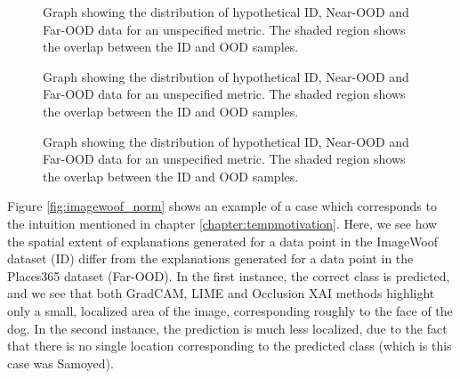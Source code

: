 \documentclass[UKenglish]{uiomasterthesis} %
\theoremstyle{definition}
\begin{document}
\begin{figure}
    \label{fig:gradcam}
    \begin{center}
        
    \end{center}
    \caption[Hypothetical ID/OOD distributions for an OOD detection metric]{Graph showing the distribution of hypothetical ID, Near-OOD and Far-OOD data for an unspecified metric. The shaded region shows the overlap between the ID and OOD samples.}
\end{figure}

\begin{figure}
    \label{fig:gradcam}
    \begin{center}
        
    \end{center}
    \caption[Hypothetical ID/OOD distributions for an OOD detection metric]{Graph showing the distribution of hypothetical ID, Near-OOD and Far-OOD data for an unspecified metric. The shaded region shows the overlap between the ID and OOD samples.}
\end{figure}

\begin{figure}
    \label{fig:lime}
    \begin{center}
        
    \end{center}
    \caption[Hypothetical ID/OOD distributions for an OOD detection metric]{Graph showing the distribution of hypothetical ID, Near-OOD and Far-OOD data for an unspecified metric. The shaded region shows the overlap between the ID and OOD samples.}
\end{figure}


Figure \ref{fig:imagewoof_norm} shows an example of a case which corresponds to the intuition mentioned in chapter \ref{chapter:tempmotivation}. Here, we see how the spatial extent of explanations generated for a data point in the ImageWoof dataset (ID) differ from the explanations generated for a data point in the Places365 dataset (Far-OOD). In the first instance, the correct class is predicted, and we see that both GradCAM, LIME and Occlusion XAI methods highlight only a small, localized area of the image, corresponding roughly to the face of the dog. In the second instance, the prediction is much less localized, due to the fact that there is no single location corresponding to the predicted class (which is this case was Samoyed).
\end{document}
